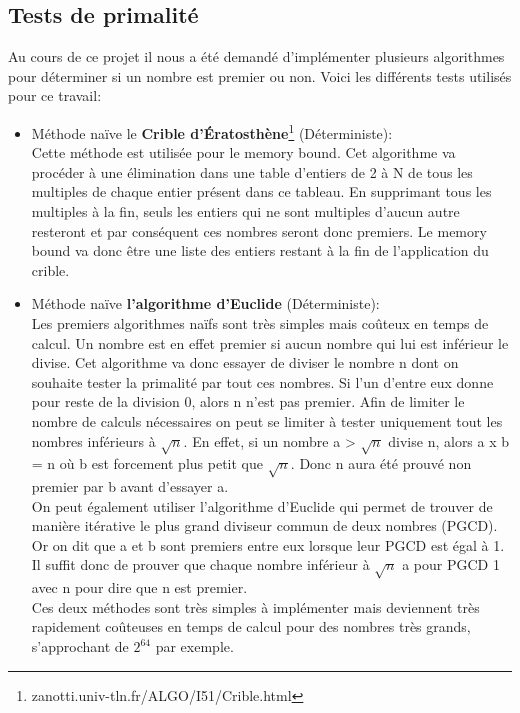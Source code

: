 		\subsection{Tests de primalité}
		Au cours de ce projet il nous a été demandé d'implémenter plusieurs algorithmes pour déterminer si un nombre est premier ou non. Voici les différents tests utilisés pour ce travail:
		\begin{itemize}
			\item Méthode naïve le \textbf{Crible d’Ératosthène}\footnote{zanotti.univ-tln.fr/ALGO/I51/Crible.html} (Déterministe): \\
			Cette méthode est utilisée pour le memory bound. Cet algorithme va procéder à une élimination dans une table d'entiers de 2 à N de tous les multiples de chaque entier présent dans ce tableau. En supprimant tous les multiples à la fin, seuls les entiers qui ne sont multiples d'aucun autre resteront et par conséquent ces nombres seront donc premiers. Le memory bound va donc être une liste des entiers restant à la fin de l'application du crible.\\
			
			\item Méthode naïve \textbf{l'algorithme d'Euclide} (Déterministe):\\ 
			Les premiers algorithmes naïfs sont très simples mais coûteux en temps de calcul. Un nombre est en effet premier si aucun nombre qui lui est inférieur le divise. Cet algorithme va donc essayer de diviser le nombre n dont on souhaite tester la primalité par tout ces nombres. Si l'un d'entre eux donne pour reste de la division 0, alors n n'est pas premier. Afin de limiter le nombre de calculs nécessaires on peut se limiter à tester uniquement tout les nombres inférieurs à $\sqrt{n}$. En effet, si un nombre a > $\sqrt{n}$ divise n, alors a x b = n où b est forcement plus petit que $\sqrt{n}$. Donc n aura été prouvé non premier par b avant d'essayer a.\\
On peut également utiliser l'algorithme d'Euclide qui permet de trouver de manière itérative le plus grand diviseur commun de deux nombres (PGCD). Or on dit que a et b sont premiers entre eux lorsque leur PGCD est égal à 1. Il suffit donc de prouver que chaque nombre inférieur à $\sqrt{n}$ a pour PGCD 1 avec n pour dire que n est premier.
\\
Ces deux méthodes sont très simples à implémenter mais deviennent très rapidement coûteuses en temps de calcul pour des nombres très grands, s'approchant de $2^{64}$ par exemple.\\
			

\end{itemize}
